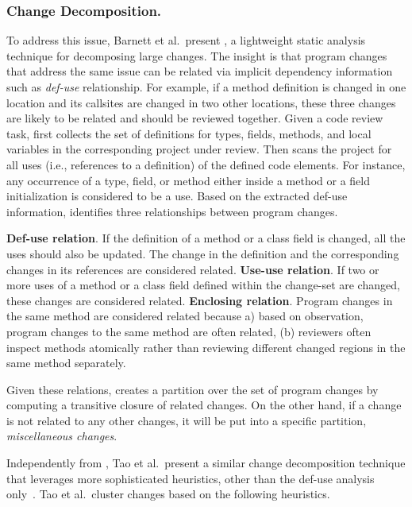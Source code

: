 \documentclass[runningheads,a4paper]{llncs}
\begin{document}
\subsubsection{Change Decomposition.}

To address this issue, Barnett et al.~present {\clusterchanges}, a lightweight static analysis technique for decomposing large changes. The insight is that program changes that address the same issue can be related via implicit dependency information such as {\em def-use} relationship. For example, if a method definition is changed in one location and its callsites are changed in two other locations, these three changes are likely to be related and should be reviewed together. Given a code review task, {\clusterchanges} first collects the set of definitions for types, fields, methods, and local variables in the corresponding project under review. Then {\clusterchanges} scans the project for all uses (i.e., references to a definition) of the defined code elements. For instance, any occurrence of a type, field, or method either inside a method or a field initialization is considered to be a use. Based on the extracted def-use information, {\clusterchanges} identifies three relationships between program changes. 

 {\bf Def-use relation}. If the definition of a method or a class field is changed, all the uses should also be updated. The change in the definition and the corresponding changes in its references are considered related.
 {\bf Use-use relation}. If two or more uses of a method or a class field defined within the change-set are changed, these changes are considered related. 
 {\bf Enclosing relation}. Program changes in the same method are considered related because a) based on observation, program changes to the same method are often related, (b) reviewers often inspect methods atomically rather than reviewing different changed regions in the same method separately.

Given these relations, {\clusterchanges} creates a partition over the set of program changes by computing a transitive closure of related changes. On the other hand, if a change is not related to any other changes, it will be put into a specific partition, {\em miscellaneous changes}.

Independently from {\clusterchanges}, Tao et al.~present a similar change decomposition technique that leverages more sophisticated heuristics, other than the def-use analysis only~\cite{tao2015partitioning}. Tao et al.~cluster changes based on the following heuristics.
\end{document}
